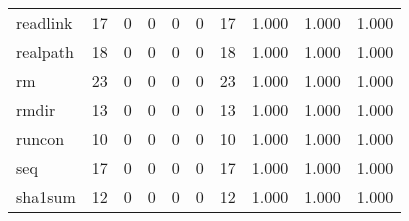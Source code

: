 \begin{longtable}{lp{2.0cm}p{2.0cm}p{2.0cm}p{2.0cm}p{2.0cm}p{2.0cm}p{2.0cm}p{2.0cm}p{2.0cm}}
readlink  &                     17 &                                             0 &                                            0 &                                           0 &                                            0 &                                         17 &                                1.000 &                                  1.000 &                                1.000 \\
realpath  &                     18 &                                             0 &                                            0 &                                           0 &                                            0 &                                         18 &                                1.000 &                                  1.000 &                                1.000 \\
rm        &                     23 &                                             0 &                                            0 &                                           0 &                                            0 &                                         23 &                                1.000 &                                  1.000 &                                1.000 \\
rmdir     &                     13 &                                             0 &                                            0 &                                           0 &                                            0 &                                         13 &                                1.000 &                                  1.000 &                                1.000 \\
runcon    &                     10 &                                             0 &                                            0 &                                           0 &                                            0 &                                         10 &                                1.000 &                                  1.000 &                                1.000 \\
seq       &                     17 &                                             0 &                                            0 &                                           0 &                                            0 &                                         17 &                                1.000 &                                  1.000 &                                1.000 \\
sha1sum   &                     12 &                                             0 &                                            0 &                                           0 &                                            0 &                                         12 &                                1.000 &                                  1.000 &                                1.000 \\

\end{longtable}
